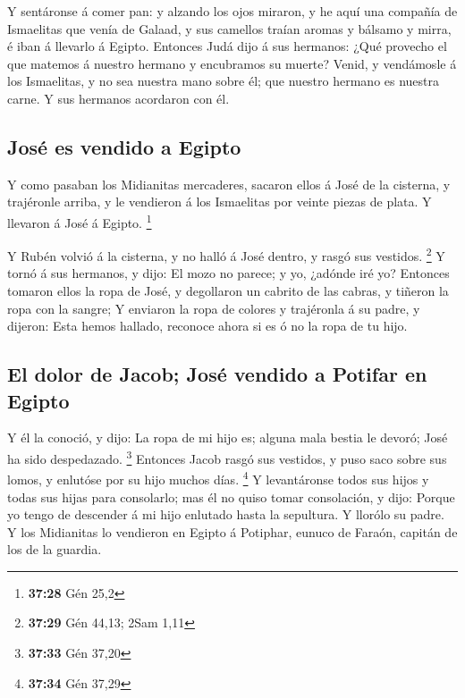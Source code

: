 Y sentáronse á comer pan: y alzando los ojos miraron, y he
aquí una compañía de Ismaelitas que venía de Galaad, y sus camellos
traían aromas y bálsamo y mirra, é iban á llevarlo á Egipto.
 Entonces Judá dijo á sus hermanos: ¿Qué provecho el que
matemos á nuestro hermano y encubramos su muerte?  Venid, y
vendámosle á los Ismaelitas, y no sea nuestra mano sobre él; que nuestro
hermano es nuestra carne. Y sus hermanos acordaron con él.

\hypertarget{josuxe9-es-vendido-a-egipto}{%
\subsection{José es vendido a
Egipto}\label{josuxe9-es-vendido-a-egipto}}

 Y como pasaban los Midianitas mercaderes, sacaron ellos á
José de la cisterna, y trajéronle arriba, y le vendieron á los
Ismaelitas por veinte piezas de plata. Y llevaron á José á Egipto.
\footnote{\textbf{37:28} Gén 25,2}

 Y Rubén volvió á la cisterna, y no halló á José dentro, y
rasgó sus vestidos. \footnote{\textbf{37:29} Gén 44,13; 2Sam 1,11}
 Y tornó á sus hermanos, y dijo: El mozo no parece; y yo,
¿adónde iré yo?  Entonces tomaron ellos la ropa de José, y
degollaron un cabrito de las cabras, y tiñeron la ropa con la sangre;
 Y enviaron la ropa de colores y trajéronla á su padre, y
dijeron: Esta hemos hallado, reconoce ahora si es ó no la ropa de tu
hijo.

\hypertarget{el-dolor-de-jacob-josuxe9-vendido-a-potifar-en-egipto}{%
\subsection{El dolor de Jacob; José vendido a Potifar en
Egipto}\label{el-dolor-de-jacob-josuxe9-vendido-a-potifar-en-egipto}}

 Y él la conoció, y dijo: La ropa de mi hijo es; alguna
mala bestia le devoró; José ha sido despedazado. \footnote{\textbf{37:33}
  Gén 37,20}  Entonces Jacob rasgó sus vestidos, y puso
saco sobre sus lomos, y enlutóse por su hijo muchos días. \footnote{\textbf{37:34}
  Gén 37,29}  Y levantáronse todos sus hijos y todas sus
hijas para consolarlo; mas él no quiso tomar consolación, y dijo: Porque
yo tengo de descender á mi hijo enlutado hasta la sepultura. Y llorólo
su padre.  Y los Midianitas lo vendieron en Egipto á
Potiphar, eunuco de Faraón, capitán de los de la guardia.


